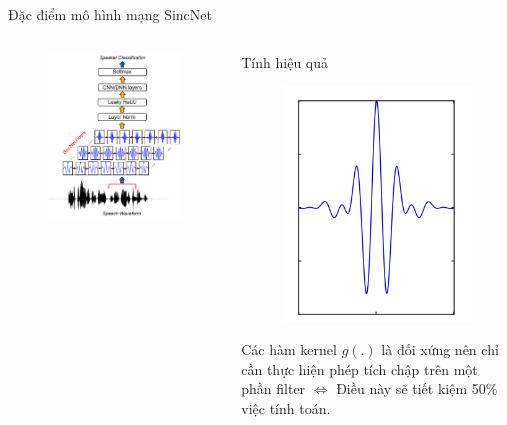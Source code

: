\documentclass[11pt]{beamer}
\begin{document}
\begin{frame}{Đặc điểm mô hình mạng SincNet}
	\begin{columns}
		\begin{column}{0.47\textwidth}
			\begin{figure}[H]
				\includegraphics[width=0.9\linewidth]{images/SincNet.png}
			\end{figure}
		\end{column}
		\begin{column}{0.5\textwidth}
			Tính hiệu quả
			\begin{figure}[H]
				\includegraphics[width=0.35\linewidth]{images/g_symmetric.png}
			\end{figure}
			Các hàm kernel $g(.)$ là đối xứng nên chỉ cần thực hiện phép tích chập trên một phần filter $\Leftrightarrow$ Điều này sẽ tiết kiệm 50\% việc tính toán.
		\end{column}
	\end{columns}
\end{frame}
\end{document}
